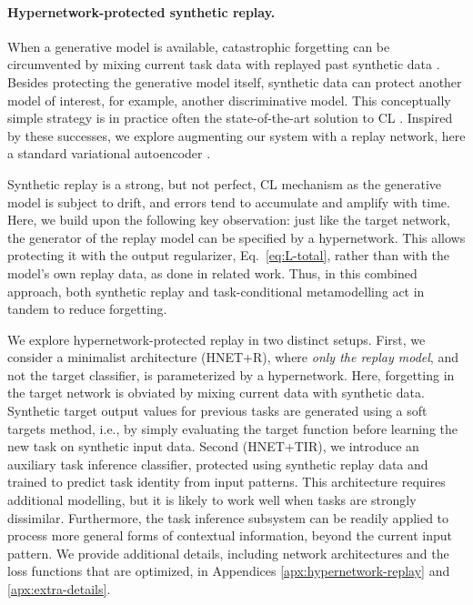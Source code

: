 \documentclass{article}
\begin{document}
\vspace{-2mm}
\paragraph{Hypernetwork-protected synthetic replay.} When a generative model is available, catastrophic forgetting can be circumvented by mixing current task data with replayed past synthetic data \citep[for recent work see][]{shin_continual_2017,wu_memory_2018}. Besides protecting the generative model itself, synthetic data can protect another model of interest, for example, another discriminative model. This conceptually simple strategy is in practice often the state-of-the-art solution to CL \citep{van_de_ven_three_2019}. Inspired by these successes, we explore augmenting our system with a replay network, here a standard variational autoencoder \citep[VAE;][]{kingma_auto-encoding_2014} \citep[but see Appendix \ref{apx:qualitative-replay-experiments} for experiments with a generative adversarial network,][]{goodfellow2014generative}.

Synthetic replay is a strong, but not perfect, CL mechanism as the generative model is subject to drift, and errors tend to accumulate and amplify with time. Here, we build upon the following key observation: just like the target network, the generator of the replay model can be specified by a hypernetwork. This allows protecting it with the output regularizer, Eq.~\ref{eq:L-total}, rather than with the model's own replay data, as done in related work. Thus, in this combined approach, both synthetic replay and task-conditional metamodelling act in tandem to reduce forgetting.

We explore hypernetwork-protected replay in two distinct setups. First, we consider a minimalist architecture (HNET+R), where \emph{only the replay model}, and not the target classifier, is parameterized by a hypernetwork. Here, forgetting in the target network is obviated by mixing current data with synthetic data. Synthetic target output values for previous tasks are generated using a soft targets method, i.e., by simply evaluating the target function before learning the new task on synthetic input data. Second (HNET+TIR), we introduce an auxiliary task inference classifier, protected using synthetic replay data and trained to predict task identity from input patterns. This architecture requires additional modelling, but it is likely to work well when tasks are strongly dissimilar. Furthermore, the task inference subsystem can be readily applied to process more general forms of contextual information, beyond the current input pattern. We provide additional details, including network architectures and the loss functions that are optimized, in Appendices \ref{apx:hypernetwork-replay} and \ref{apx:extra-details}.
\end{document}
